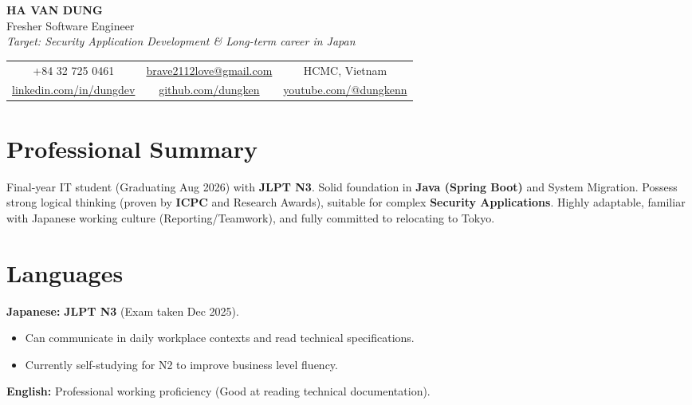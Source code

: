 \documentclass[10pt,a4paper]{article}
\newcommand{\contactinfo}[2]{
    \makebox[0pt][l]{\textcolor{secondary}{#1}}%
    \hspace{14pt}#2
}
\begin{document}
\pagestyle{empty}

\begin{center}
    {\fontsize{24}{28}\bfseries\color{primary}HA VAN DUNG}\\[4pt]
    {\Large\textcolor{secondary}{Fresher Software Engineer}}\\[4pt]
    \small \textit{Target: Security Application Development \& Long-term career in Japan} \\[6pt]
    
    \small
    \begin{tabular}{c c c}
        \contactinfo{\faPhone}{+84 32 725 0461} & 
        \contactinfo{\faEnvelope}{\href{mailto:dungken2211@gmail.com}{brave2112love@gmail.com}} & 
        \contactinfo{\faMapMarkerAlt}{HCMC, Vietnam} \\
        \contactinfo{\faLinkedin}{\href{https://linkedin.com/in/dungdev}{linkedin.com/in/dungdev}} & 
        \contactinfo{\faGithub}{\href{https://github.com/dungken}{github.com/dungken}} & 
        \contactinfo{\faYoutube}{\href{https://youtube.com/@dungkenn}{youtube.com/@dungkenn}}
    \end{tabular}
\end{center}

\vspace{2pt}

\section{Professional Summary}
Final-year IT student (Graduating Aug 2026) with \textbf{JLPT N3}. Solid foundation in \textbf{Java (Spring Boot)} and System Migration. Possess strong logical thinking (proven by \textbf{ICPC} and Research Awards), suitable for complex \textbf{Security Applications}. Highly adaptable, familiar with Japanese working culture (Reporting/Teamwork), and fully committed to relocating to Tokyo.

\section{Languages}
\noindent
\textbf{Japanese:} \textbf{JLPT N3} (Exam taken Dec 2025). 
\begin{itemize}[leftmargin=15pt, nosep]
    \item Can communicate in daily workplace contexts and read technical specifications.
    \item Currently self-studying for N2 to improve business level fluency.
\end{itemize}
\vspace{2pt}
\noindent
\textbf{English:} Professional working proficiency (Good at reading technical documentation).
\end{document}

